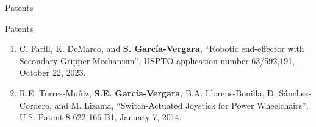 \documentclass{resume} %
\newcommand{\sectionspace}{\vspace{3mm}}
\begin{document}
\begin{rSection}{Patents}

\begin{rSubsection}{Patents}{}{}{}
\item
  \begin{enumerate}

  \item C. Farill, K. DeMarco, and \textbf{S. Garc\'{i}a-Vergara}, ``Robotic
    end-effector with Secondary Gripper Mechanism'', USPTO application number
    63/592,191, October 22, 2023.


  \item R.E. Torres-Mu\~{n}iz, \textbf{S.E. Garc\'{i}a-Vergara},
    B.A. Llorens-Bonilla, D. S\'{a}nchez-Cordero, and M. Lizama,
    ``Switch-Actuated Joystick for Power Wheelchairs'', U.S. Patent 8 622 166
    B1, January 7, 2014.


\end{enumerate}

\end{rSubsection}
\end{rSection}







\iffalse
\sectionspace
\begin{rSection}{References}
Available upon request.
\end{rSection}
\fi


\end{document}
